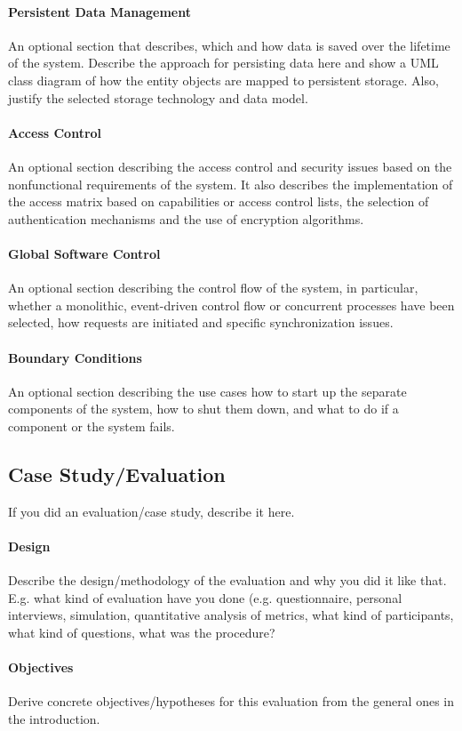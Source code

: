 	\paragraph{Persistent Data Management}
		An optional section that describes, which and how data is saved over the lifetime of the system.
		Describe the approach for persisting data here and show a UML class diagram of how the entity objects are mapped to persistent storage.
		Also, justify the selected storage technology and data model.
	\paragraph{Access Control}
		An optional section describing the access control and security issues based on the nonfunctional requirements of the system.
		It also describes the implementation of the access matrix based on capabilities or access control lists, the selection of authentication mechanisms and the use of encryption algorithms.
	\paragraph{Global Software Control}
		An optional section describing the control flow of the system, in particular, whether a monolithic, event-driven control flow or concurrent processes have been selected, how requests are initiated and specific synchronization issues.
	\paragraph{Boundary Conditions}
		An optional section describing the use cases how to start up the separate components of the system, how to shut them down, and what to do if a component or the system fails.

\subsection{Case Study/Evaluation}
	If you did an evaluation/case study, describe it here.
	\paragraph{Design}
		Describe the design/methodology of the evaluation and why you did it like that.
		E.g. what kind of evaluation have you done (e.g. questionnaire, personal interviews, simulation, quantitative analysis of metrics, what kind of participants, what kind of questions, what was the procedure?
	\paragraph{Objectives}
		Derive concrete objectives/hypotheses for this evaluation from the general ones in the introduction.
